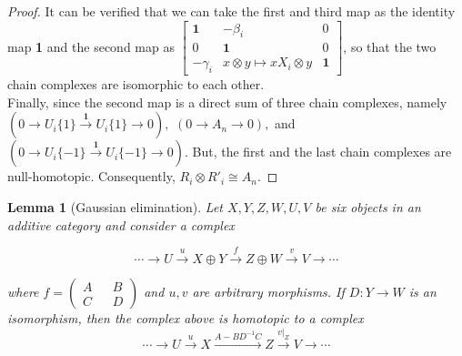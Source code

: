 \documentclass[psamsfonts,a4paper]{amsart}
\theoremstyle{plain}
\newtheorem{lemma}[theorem]{Lemma}
\numberwithin{equation}{section}
\numberwithin{figure}{section}
\renewcommand{\b}{\beta}
\newcommand{\ra}{\rightarrow}
\newcommand{\xra}{\xrightarrow}
\newcommand{\tb}{\textbf}
\newcommand{\ot}{\otimes}
\newcommand{\op}{\oplus}
\newcommand{\<}{\langle}
\renewcommand{\>}{\rangle}
\theoremstyle{named}
\theoremstyle{name}
\begin{document}
\begin{proof}
It can be verified that we can take the first and third map as the identity map \tb{1} and the second map as $\begin{bmatrix}
\textbf{1} & -\b_i & 0 \\
0 & \textbf{1} & 0 \\
-\gamma_i & x \ot y \mapsto xX_i \ot y & \textbf{1}
\end{bmatrix}$, so that the two chain complexes are isomorphic to each other.\\

Finally, since the second map is a direct sum of three chain complexes, namely $(0 \ra U_i\{1\} \xra{\tb{1}} U_i\{1\} \ra 0),$ $(0 \ra A_n \ra 0),$ and $(0 \ra U_i\{-1\} \xra{\tb{1}} U_i\{-1\} \ra 0).$ 
	But, the first and the last chain complexes are null-homotopic. 
	Consequently, $R_i \ot R'_i \cong A_n.$

\end{proof}


\color{black}
\begin{lemma}[Gaussian elimination]
Let $X, Y, Z, W, U, V$ be six objects in  an additive category and consider a complex

$$\cdots \ra U \xra{u} X \op Y \xra{f} Z \op W \xra{v} V \ra \cdots $$

where $f = \begin{pmatrix}
A && B \\
C && D
\end{pmatrix}$ and $u,v$ are arbitrary morphisms.
	If $D: Y \ra W$ is an isomorphism, then the complex above is homotopic to a complex
	$$\cdots \ra U \xra{u} X  \xra{A-BD^{-1}C} Z \xra{v|_Z} V \ra \cdots $$

\end{lemma}
\end{document}
